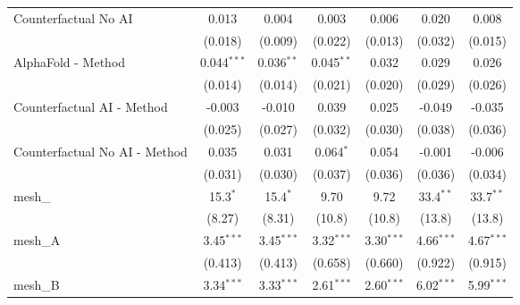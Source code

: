 \begin{tabular}{lcccccc}
   Counterfactual No AI                                        & 0.013          & 0.004          & 0.003          & 0.006          & 0.020          & 0.008\\   
                                                               & (0.018)        & (0.009)        & (0.022)        & (0.013)        & (0.032)        & (0.015)\\   
   AlphaFold - Method                                          & 0.044$^{***}$  & 0.036$^{**}$   & 0.045$^{**}$   & 0.032          & 0.029          & 0.026\\   
                                                               & (0.014)        & (0.014)        & (0.021)        & (0.020)        & (0.029)        & (0.026)\\   
   Counterfactual AI - Method                                  & -0.003         & -0.010         & 0.039          & 0.025          & -0.049         & -0.035\\   
                                                               & (0.025)        & (0.027)        & (0.032)        & (0.030)        & (0.038)        & (0.036)\\   
   Counterfactual No AI - Method                               & 0.035          & 0.031          & 0.064$^{*}$    & 0.054          & -0.001         & -0.006\\   
                                                               & (0.031)        & (0.030)        & (0.037)        & (0.036)        & (0.036)        & (0.034)\\   
   mesh\_                                                      & 15.3$^{*}$     & 15.4$^{*}$     & 9.70           & 9.72           & 33.4$^{**}$    & 33.7$^{**}$\\   
                                                               & (8.27)         & (8.31)         & (10.8)         & (10.8)         & (13.8)         & (13.8)\\   
   mesh\_A                                                     & 3.45$^{***}$   & 3.45$^{***}$   & 3.32$^{***}$   & 3.30$^{***}$   & 4.66$^{***}$   & 4.67$^{***}$\\   
                                                               & (0.413)        & (0.413)        & (0.658)        & (0.660)        & (0.922)        & (0.915)\\   
   mesh\_B                                                     & 3.34$^{***}$   & 3.33$^{***}$   & 2.61$^{***}$   & 2.60$^{***}$   & 6.02$^{***}$   & 5.99$^{***}$\\   

\end{tabular}
